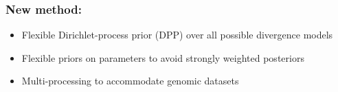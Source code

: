 \begin{frame}
    \frametitle{New method: \dppmsbayes}
    \begin{itemize}[<+->]
        \item Flexible Dirichlet-process prior (DPP) over all possible
            divergence models
        \item Flexible priors on parameters to avoid strongly weighted
            posteriors
        \item Multi-processing to accommodate genomic datasets
    \end{itemize}
\end{frame}

